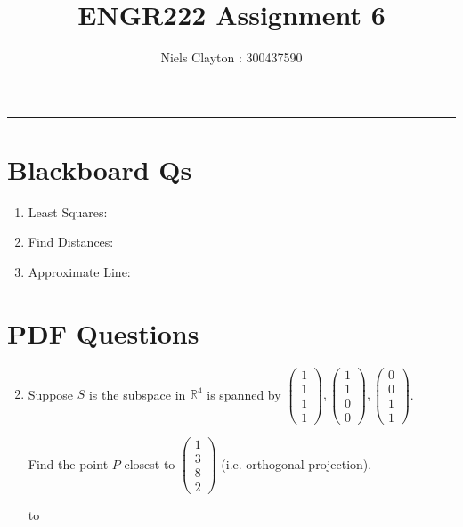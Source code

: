 \documentclass[a4paper,11pt]{article}
\title{\LARGE{\textbf{ENGR222 Assignment 6}}}
\author{Niels Clayton : 300437590}
\date{}
\newcommand{\hdotrule}[1]{\hbox to \textwidth{\leaders\hbox to #1pt{\hss . \hss}\hfil}}
\begin{document}
\begin{preview}
    \maketitle
    \hrule


	\section*{Blackboard Qs}
    \begin{enumerate}
          \item Least Squares:
          \item Find Distances:
          \item Approximate Line:
    \end{enumerate}

	\section*{PDF Questions}

	\begin{enumerate}
		\setcounter{enumi}{1}
		\item Suppose $S$ is the subspace in $\mathbb{R}^4$ is spanned by $\begin{pmatrix} 1\\1\\1\\1 \end{pmatrix},\begin{pmatrix} 1\\1\\0\\0 \end{pmatrix},\begin{pmatrix} 0\\0\\1\\1 \end{pmatrix}$. 
		
		Find the point $P$ closest to $\begin{pmatrix}1\\3\\8\\2\end{pmatrix}$ (i.e. orthogonal projection).

		\hdotrule{5}
		

		\begin{python}
		\end{python}


\end{enumerate}
\end{preview}
\end{document}
